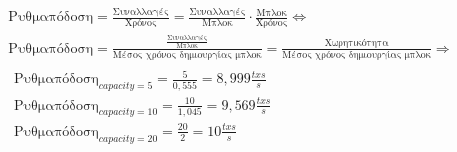 \documentclass{article}
\newcommand{\eng}[1]{\foreignlanguage{english}{#1}} %
\begin{document}
\begin{equation}
    \begin{gathered}
        \text{Ρυθμαπόδοση} = \frac{\text{Συναλλαγές}}{\text{Χρόνος}} = \frac{\text{Συναλλαγές}}{\text{Μπλοκ}}\cdot \frac{\text{Μπλοκ}}{\text{Χρόνος}} \Leftrightarrow \\
        \text{Ρυθμαπόδοση} = \frac{\frac{\text{Συναλλαγές}}{\text{Μπλοκ}} }{\text{Μέσος χρόνος δημιουργίας μπλοκ}} = \frac{\text{Χωρητικότητα}}{\text{Μέσος χρόνος δημιουργίας μπλοκ}} \Rightarrow \\
    \boxed{
        \begin{gathered}
            \text{Ρυθμαπόδοση}_{capacity=5} = \frac{5}{0,555} = 8,999 \text{} \frac{txs}{s}\\
            \text{Ρυθμαπόδοση}_{capacity=10} = \frac{10}{1,045} = 9,569 \text{} \frac{txs}{s}\\
            \text{Ρυθμαπόδοση}_{capacity=20} = \frac{20}{2} = 10 \text{} \frac{txs}{s}\\
        \end{gathered}
    }
    \end{gathered}
\end{equation}

% 
%             
%             
%             
\end{document}
